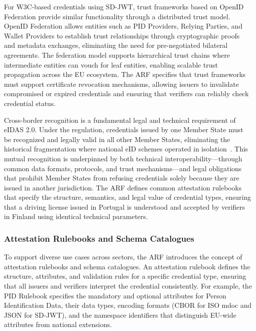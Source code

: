 \documentclass[sigconf,balance,nonacm,authordraft]{acmart}
\begin{document}
For W3C-based credentials using SD-JWT, trust frameworks based on OpenID Federation provide similar functionality through a distributed trust model. OpenID Federation allows entities such as PID Providers, Relying Parties, and Wallet Providers to establish trust relationships through cryptographic proofs and metadata exchanges, eliminating the need for pre-negotiated bilateral agreements. The federation model supports hierarchical trust chains where intermediate entities can vouch for leaf entities, enabling scalable trust propagation across the EU ecosystem. The ARF specifies that trust frameworks must support certificate revocation mechanisms, allowing issuers to invalidate compromised or expired credentials and ensuring that verifiers can reliably check credential status.

Cross-border recognition is a fundamental legal and technical requirement of eIDAS 2.0. Under the regulation, credentials issued by one Member State must be recognized and legally valid in all other Member States, eliminating the historical fragmentation where national eID schemes operated in isolation~\cite{Finextra_SSI_Differences}. This mutual recognition is underpinned by both technical interoperability—through common data formats, protocols, and trust mechanisms—and legal obligations that prohibit Member States from refusing credentials solely because they are issued in another jurisdiction. The ARF defines common attestation rulebooks that specify the structure, semantics, and legal value of credential types, ensuring that a driving license issued in Portugal is understood and accepted by verifiers in Finland using identical technical parameters.

\subsubsection{Attestation Rulebooks and Schema Catalogues}

To support diverse use cases across sectors, the ARF introduces the concept of attestation rulebooks and schema catalogues. An attestation rulebook defines the structure, attributes, and validation rules for a specific credential type, ensuring that all issuers and verifiers interpret the credential consistently. For example, the PID Rulebook specifies the mandatory and optional attributes for Person Identification Data, their data types, encoding formats (CBOR for ISO mdoc and JSON for SD-JWT), and the namespace identifiers that distinguish EU-wide attributes from national extensions.
\end{document}
